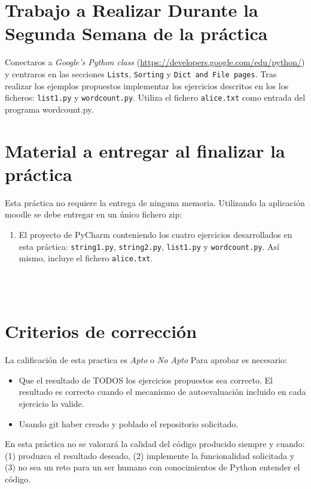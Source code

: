 \documentclass[12pt]{article} %
\begin{document}
\section{Trabajo a Realizar Durante la Segunda Semana de la práctica}
Conectaros a \textit{Google’s Python class} (\url{https://developers.google.com/edu/python/}) y centraros en las secciones  \texttt{Lists}, \texttt{Sorting} y \texttt{Dict and File pages}. Tras realizar los ejemplos propuestos implementar  los ejercicios descritos en los los ficheros: \texttt{list1.py} y \texttt{wordcount.py}.
Utiliza el fichero \texttt{alice.txt} como entrada del programa wordcount.py.

\section{Material a entregar al finalizar la práctica} %

\begin{minipage}{\linewidth}
\begin{framed}
Esta práctica no requiere la entrega de ninguna memoria. Utilizando la aplicación moodle se debe entregar en un único fichero zip:
\begin{enumerate}
\item El proyecto de PyCharm conteniendo los cuatro ejercicios desarrollados en esta práctica: \texttt{string1.py}, \texttt{string2.py}, \texttt{list1.py} y \texttt{wordcount.py}. Así mismo, incluye el fichero \texttt{alice.txt}.
\end{enumerate}
\end{framed}
\end{minipage}\\\\

\section{Criterios de corrección}

La calificación de esta practica es \textit{Apto} o \textit{No Apto}
Para aprobar es necesario:
\begin{itemize}
 \item Que el resultado de TODOS los ejercicios propuestos sea correcto. El resultado es correcto cuando el mecanismo de autoevaluación incluido en cada ejercicio lo valide.
 \item Usando git haber creado y poblado el repositorio solicitado.
\end{itemize}
 En esta práctica no se valorará la calidad del código producido siempre y cuando: (1) produzca el resultado deseado, (2) 
 implemente la funcionalidad solicitada y (3) no sea un reto para un ser humano con conocimientos de Python entender el código.
\end{document}
